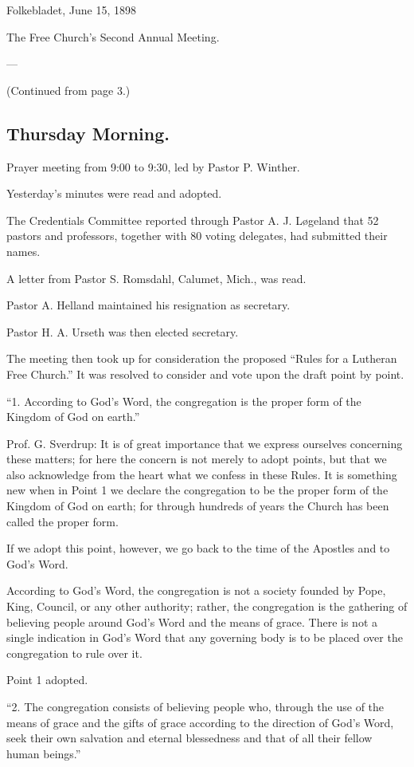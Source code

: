 
Folkebladet, June 15, 1898

The Free Church’s Second Annual Meeting.

—

(Continued from page 3.)

\subsection{Thursday Morning.}

Prayer meeting from 9:00 to 9:30, led by Pastor P. Winther.

Yesterday’s minutes were read and adopted.

The Credentials Committee reported through Pastor A. J. Løgeland that 52 pastors and professors, together with 80 voting delegates, had submitted their names.

A letter from Pastor S. Romsdahl, Calumet, Mich., was read.

Pastor A. Helland maintained his resignation as secretary.

Pastor H. A. Urseth was then elected secretary.

The meeting then took up for consideration the proposed “Rules for a Lutheran Free Church.” It was resolved to consider and vote upon the draft point by point.

“1. According to God’s Word, the congregation is the proper form of the Kingdom of God on earth.”

Prof. G. Sverdrup: It is of great importance that we express ourselves concerning these matters; for here the concern is not merely to adopt points, but that we also acknowledge from the heart what we confess in these Rules. It is something new when in Point 1 we declare the congregation to be the proper form of the Kingdom of God on earth; for through hundreds of years the Church has been called the proper form.

If we adopt this point, however, we go back to the time of the Apostles and to God’s Word.

According to God’s Word, the congregation is not a society founded by Pope, King, Council, or any other authority; rather, the congregation is the gathering of believing people around God’s Word and the means of grace. There is not a single indication in God’s Word that any governing body is to be placed over the congregation to rule over it.

Point 1 adopted.

“2. The congregation consists of believing people who, through the use of the means of grace and the gifts of grace according to the direction of God’s Word, seek their own salvation and eternal blessedness and that of all their fellow human beings.”


